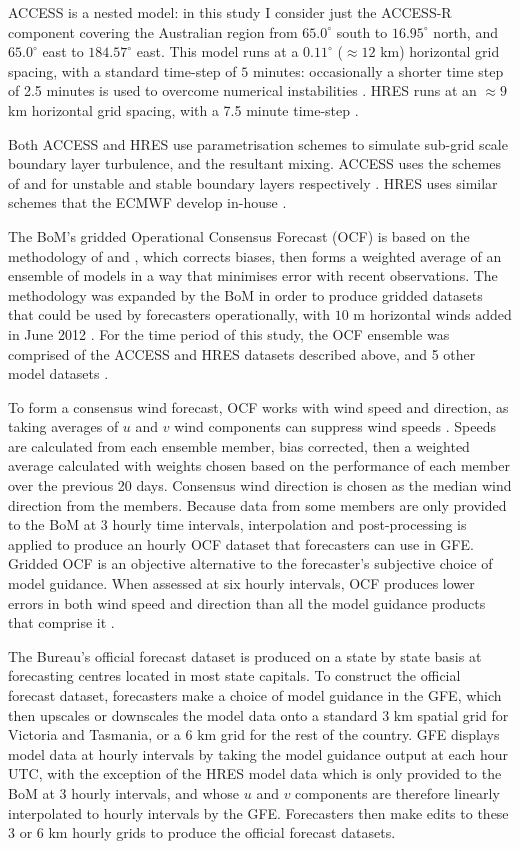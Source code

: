 \documentclass[twocol]{ametsoc}
\begin{document}
ACCESS is a nested model: in this study I consider just the ACCESS-R component covering the Australian region from $65.0^\circ$ south to $16.95^\circ$ north, and $65.0^\circ$ east to $184.57^\circ$ east. This model runs at a $0.11^\circ$ ($\approx 12$ km) horizontal grid spacing, with a standard time-step of $5$ minutes: occasionally a shorter time step of 2.5 minutes is used to overcome numerical instabilities \citep{bom16}. HRES runs at an $\approx 9$ km horizontal grid spacing, with a 7.5 minute time-step \citep{ecmwf19c}. 

Both ACCESS and HRES use parametrisation schemes to simulate sub-grid scale boundary layer turbulence, and the resultant mixing. ACCESS uses the schemes of \citet{lock00} and \citet{louis79} for unstable and stable boundary layers respectively \citep{bom10}. HRES uses similar schemes that the ECMWF develop in-house \citep{ecmwf19a}.

The BoM's gridded Operational Consensus Forecast (OCF) is based on the methodology of \citet{woodcock05} and \citet{engel07}, which corrects biases, then forms a weighted average of an ensemble of models in a way that minimises error with recent observations. The methodology was expanded by the BoM in order to produce gridded datasets that could be used by forecasters operationally, with $10$ m horizontal winds added in June 2012 \citep{bom05, bom08, bom12}. For the time period of this study, the OCF ensemble was comprised of the ACCESS and HRES datasets described above, and 5 other model datasets  \citep{bom18}.

To form a consensus wind forecast, OCF works with wind speed and direction, as taking averages of $u$ and $v$ wind components can suppress wind speeds \citep{glahn72}. Speeds are calculated from each ensemble member, bias corrected, then a weighted average calculated with weights chosen based on the performance of each member over the previous 20 days. Consensus wind direction is chosen as the median wind direction from the members. Because data from some members are only provided to the BoM at 3 hourly time intervals, interpolation and post-processing is applied to produce an hourly OCF dataset that forecasters can use in GFE. Gridded OCF is an objective alternative to the forecaster's subjective choice of model guidance. When assessed at six hourly intervals, OCF produces lower errors in both wind speed and direction than all the model guidance products that comprise it \citep{bom12}.

The Bureau's official forecast dataset is produced on a state by state basis at forecasting centres located in most state capitals. To construct the official forecast dataset, forecasters make a choice of model guidance in the GFE, which then upscales or downscales the model data onto a standard 3 km spatial grid for Victoria and Tasmania, or a 6 km grid for the rest of the country. GFE displays model data at hourly intervals by taking the model guidance output at each hour UTC, with the exception of the HRES model data which is only provided to the BoM at 3 hourly intervals, and whose $u$ and $v$ components are therefore linearly interpolated to hourly intervals by the GFE. Forecasters then make edits to these 3 or 6 km hourly grids to produce the official forecast datasets.
\end{document}
